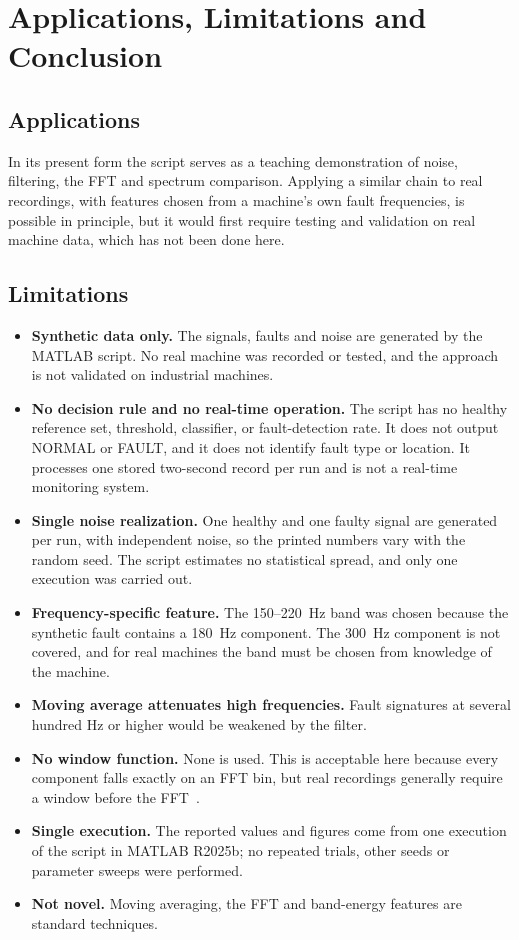 \documentclass[10pt,twocolumn,a4paper]{article}
\begin{document}
\section{Applications, Limitations and Conclusion}
\subsection{Applications}
In its present form the script serves as a teaching demonstration of noise, filtering, the FFT and spectrum comparison.
Applying a similar chain to real recordings, with features chosen from a machine's own fault frequencies, is possible in
principle, but it would first require testing and validation on real machine data, which has not been done here.

\subsection{Limitations}\label{sec:limits}
\begin{itemize}
\item \textbf{Synthetic data only.} The signals, faults and noise are generated by the MATLAB script. No real machine was recorded or tested, and the approach is not validated on industrial machines.
\item \textbf{No decision rule and no real-time operation.} The script has no healthy reference set, threshold, classifier, or fault-detection rate. It does not output NORMAL or FAULT, and it does not identify fault type or location. It processes one stored two-second record per run and is not a real-time monitoring system.
\item \textbf{Single noise realization.} One healthy and one faulty signal are generated per run, with independent noise, so the printed numbers vary with the random seed. The script estimates no statistical spread, and only one execution was carried out.
\item \textbf{Frequency-specific feature.} The 150--220~Hz band was chosen because the synthetic fault contains a 180~Hz component. The 300~Hz component is not covered, and for real machines the band must be chosen from knowledge of the machine.
\item \textbf{Moving average attenuates high frequencies.} Fault signatures at several hundred Hz or higher would be weakened by the filter.
\item \textbf{No window function.} None is used. This is acceptable here because every component falls exactly on an FFT bin, but real recordings generally require a window before the FFT~\cite{harris}.
\item \textbf{Single execution.} The reported values and figures come from one execution of the script in MATLAB R2025b; no repeated trials, other seeds or parameter sweeps were performed.
\item \textbf{Not novel.} Moving averaging, the FFT and band-energy features are standard techniques.
\end{itemize}
\end{document}
